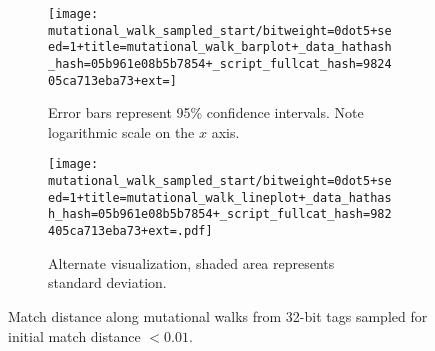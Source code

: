 \begin{figure}
\begin{center}

\begin{subfigure}{\textwidth}
\texttt{[image: mutational\_walk\_sampled\_start/bitweight=0dot5+seed=1+title=mutational\_walk\_barplot+\_data\_hathash\_hash=05b961e08b5b7854+\_script\_fullcat\_hash=982405ca713eba73+ext=]}
\caption{
Error bars represent 95\% confidence intervals.
Note logarithmic scale on the $x$ axis.
}
\label{fig:mutational_walk_sampled_start_barplot}
\end{subfigure}

\begin{subfigure}{\textwidth}
\texttt{[image: mutational\_walk\_sampled\_start/bitweight=0dot5+seed=1+title=mutational\_walk\_lineplot+\_data\_hathash\_hash=05b961e08b5b7854+\_script\_fullcat\_hash=982405ca713eba73+ext=.pdf]}
\caption{
Alternate visualization, shaded area represents standard deviation.
}
\end{subfigure}

\caption{
Match distance along mutational walks from 32-bit tags sampled for initial match distance $<0.01$.
}
\label{fig:mutational_walk_sampled_start}

\end{center}
\end{figure}
